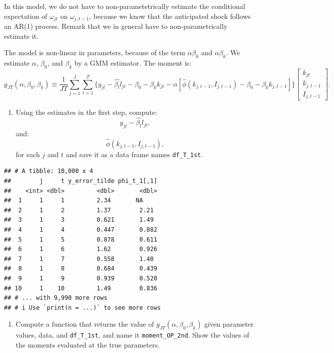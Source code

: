 \documentclass[
]{book}
\providecommand{\tightlist}{%
  \setlength{\itemsep}{0pt}\setlength{\parskip}{0pt}}
\begin{document}
In this model, we do not have to non-parametetrically estimate the conditional expectation of \(\omega_{jt}\) on \(\omega_{j, t - 1}\), because we know that the anticipated shock follows an AR(1) process. Remark that we in general have to non-parametrically estimate it.

The model is non-linear in parameters, because of the term \(\alpha \beta_0\) and \(\alpha \beta_k\). We estimate \(\alpha\), \(\beta_0\), and \(\beta_k\) by a GMM estimator. The moment is:
\[
g_{JT}(\alpha, \beta_0, \beta_k) \equiv \frac{1}{JT}\sum_{j = 1}^J \sum_{t = 1}^T \{y_{jt} - \hat{\beta_l} l_{jt} - \beta_0 - \beta_k k_{jt} - \alpha[\hat{\phi}(k_{j, t - 1}, I_{j, t - 1}) - \beta_0 - \beta_k k_{j, t-1}]\} 
\begin{bmatrix}
k_{jt} \\
k_{j, t - 1} \\
I_{j, t - 1}
\end{bmatrix}.
\]

\begin{enumerate}
\def\labelenumi{\arabic{enumi}.}
\setcounter{enumi}{4}
\tightlist
\item
  Using the estimates in the first step, compute:
  \[
  y_{jt} - \hat{\beta_l} l_{jt},
  \]
  and:
  \[
  \hat{\phi}(k_{j, t - 1}, I_{j, t - 1}),
  \]
  for each \(j\) and \(t\) and save it as a data frame names \texttt{df\_T\_1st}.
\end{enumerate}

\begin{verbatim}
## # A tibble: 10,000 x 4
##        j     t y_error_tilde phi_t_1[,1]
##    <int> <dbl>         <dbl>       <dbl>
##  1     1     1         2.34       NA    
##  2     1     2         1.37        2.21 
##  3     1     3         0.621       1.49 
##  4     1     4         0.447       0.882
##  5     1     5         0.878       0.611
##  6     1     6         1.62        0.926
##  7     1     7         0.558       1.40 
##  8     1     8         0.684       0.439
##  9     1     9         0.939       0.520
## 10     1    10         1.49        0.836
## # ... with 9,990 more rows
## # i Use `print(n = ...)` to see more rows
\end{verbatim}

\begin{enumerate}
\def\labelenumi{\arabic{enumi}.}
\setcounter{enumi}{5}
\tightlist
\item
  Compute a function that returns the value of \(g_{JT}(\alpha, \beta_0, \beta_k)\) given parameter values, data, and \texttt{df\_T\_1st}, and name it \texttt{moment\_OP\_2nd}. Show the values of the moments evaluated at the true parameters.
\end{enumerate}
\end{document}
